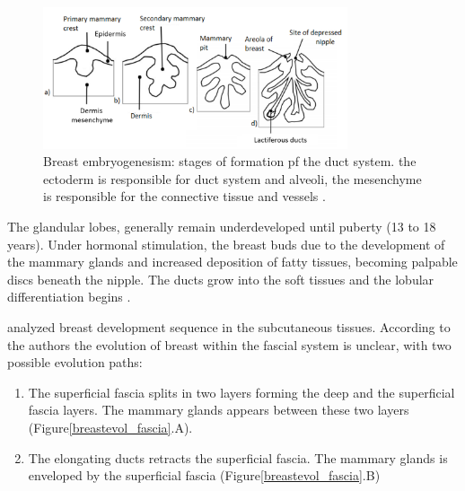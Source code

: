  \begin{figure}[!h]
 \centering
\includegraphics[width=0.8\textwidth,keepaspectratio]{figures/breast_evolution_my.png} 
\caption[Breast embryogenesis: embryonic evolution of duct system. The epidermis is responsible for the creation of ductal system and alveoli, the dermis mesenchyme is responsible for the creation of connective tissue and vessels] {Breast embryogenesism: stages of formation pf the duct system. the ectoderm is responsible for duct system and alveoli, the mesenchyme is responsible for the connective tissue and vessels \citep{skandalakis_embryology_2009}.}
\label{breastembryogenesis}
\end{figure}


The glandular lobes, generally remain underdeveloped until puberty (13 to 18 years). Under hormonal stimulation, the breast buds due to the development of the mammary glands and increased deposition of fatty tissues, becoming palpable discs beneath the nipple. The ducts grow into the soft tissues and the lobular differentiation begins \citep{kopans2007breast}. 

\cite{kopans2007breast} analyzed breast development sequence in the subcutaneous tissues. According to the authors the evolution of breast within the fascial system is unclear, with two possible evolution paths: 
\begin{enumerate}[label=(\Alph*)]
\item The superficial fascia splits in two layers forming the deep and the superficial fascia layers. The mammary glands appears between these two layers (Figure\ref{breastevol_fascia}.A).
\item The elongating ducts retracts the superficial fascia.  The mammary glands is enveloped by the superficial fascia (Figure\ref{breastevol_fascia}.B)
\end{enumerate}

